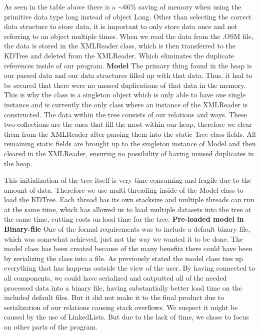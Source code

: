 As seen in the table above there is a $\sim$66\% saving of memory when using the primitive data type long instead of object Long.
\newline
Other than selecting the correct data structure to store data, it is important to only store data once and not referring to an object multiple times. When we read the data from the .OSM file, the data is stored in the XMLReader class, which is then transferred to the KDTree and deleted from the XMLReader. Which eliminates the duplicate references inside of our program.
\newline
\textbf{Model}
The primary thing found in the heap is our parsed data and our data structures filled up with that data. Thus, it had to be secured that there were no unused duplications of that data in the memory. This is why the class is a singleton object which is only able to have one single instance and is currently the only class where an instance of the XMLReader is constructed. The data within the tree consists of our relations and ways. These two collections are the ones that fill the most within our heap, therefore we clear them from the XMLReader after parsing them into the static Tree class fields. All remaining static fields are brought up to the singleton instance of Model and then cleared in the XMLReader, ensuring no possibility of having unused duplicates in the heap.\par
This initialization of the tree itself is very time consuming and fragile due to the amount of data. Therefore we use multi-threading inside of the Model class to load the KDTree. Each thread has its own stacksize and multiple threads can run at the same time, which has allowed us to load multiple datasets into the tree at the same time, cutting costs on load time for the tree.
\newline
\textbf{Pre-loaded model in Binary-file}
One of the formal requirements was to include a default binary file, which was somewhat achieved, just not the way we wanted it to be done. The model class has been created because of the many benefits there could have been by serializing the class into a file. As previously stated the model class ties up everything that has happens outside the view of the user. By having connected to all components, we could have serialized and outputted all of the needed processed data into a binary file, having substantially better load time on the included default files. But it did not make it to the final product due to serialization of our relations causing stack overflows. We suspect it might be caused by the use of LinkedLists. But due to the lack of time, we chose to focus on other parts of the program.




